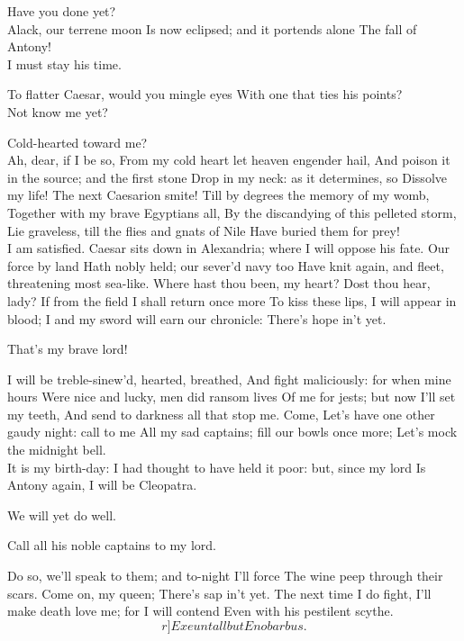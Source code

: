 \documentclass{book}
\begin{document}
\2	Have you done yet? \\

\1	                  Alack, our terrene moon
	Is now eclipsed; and it portends alone
	The fall of Antony! \\

\2	I must stay his time.

\1	To flatter Caesar, would you mingle eyes
	With one that ties his points? \\

\2	Not know me yet?

\1	Cold-hearted toward me? \\

\2	Ah, dear, if I be so,
	From my cold heart let heaven engender hail,
	And poison it in the source; and the first stone
	Drop in my neck: as it determines, so
	Dissolve my life! The next Caesarion smite!
	Till by degrees the memory of my womb,
	Together with my brave Egyptians all,
	By the discandying of this pelleted storm,
	Lie graveless, till the flies and gnats of Nile
	Have buried them for prey! \\

\1	I am satisfied.
	Caesar sits down in Alexandria; where
	I will oppose his fate. Our force by land
	Hath nobly held; our sever'd navy too
	Have knit again, and fleet, threatening most sea-like.
	Where hast thou been, my heart? Dost thou hear, lady?
	If from the field I shall return once more
	To kiss these lips, I will appear in blood;
	I and my sword will earn our chronicle:
	There's hope in't yet.

\2	That's my brave lord!

\1	I will be treble-sinew'd, hearted, breathed,
	And fight maliciously: for when mine hours
	Were nice and lucky, men did ransom lives
	Of me for jests; but now I'll set my teeth,
	And send to darkness all that stop me. Come,
	Let's have one other gaudy night: call to me
	All my sad captains; fill our bowls once more;
	Let's mock the midnight bell. \\

\2	It is my birth-day:
	I had thought to have held it poor: but, since my lord
	Is Antony again, I will be Cleopatra.

\1	We will yet do well.

\2	Call all his noble captains to my lord.

\1	Do so, we'll speak to them; and to-night I'll force
	The wine peep through their scars. Come on, my queen;
	There's sap in't yet. The next time I do fight,
	I'll make death love me; for I will contend
	Even with his pestilent scythe. 	\[r]Exeunt all but Enobarbus.\]
\end{document}

